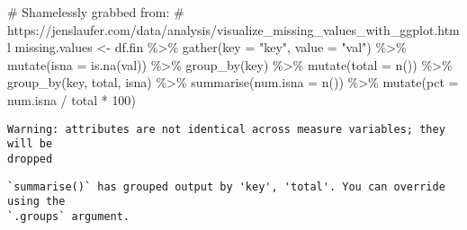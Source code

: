 \documentclass[
  letterpaper,
  DIV=11,
  numbers=noendperiod]{scrartcl}
\newenvironment{Shaded}{\begin{snugshade}}{\end{snugshade}}
\newcommand{\AttributeTok}[1]{\textcolor[rgb]{0.40,0.45,0.13}{#1}}
\newcommand{\CommentTok}[1]{\textcolor[rgb]{0.37,0.37,0.37}{#1}}
\newcommand{\DecValTok}[1]{\textcolor[rgb]{0.68,0.00,0.00}{#1}}
\newcommand{\FunctionTok}[1]{\textcolor[rgb]{0.28,0.35,0.67}{#1}}
\newcommand{\NormalTok}[1]{\textcolor[rgb]{0.00,0.23,0.31}{#1}}
\newcommand{\OtherTok}[1]{\textcolor[rgb]{0.00,0.23,0.31}{#1}}
\newcommand{\SpecialCharTok}[1]{\textcolor[rgb]{0.37,0.37,0.37}{#1}}
\newcommand{\StringTok}[1]{\textcolor[rgb]{0.13,0.47,0.30}{#1}}
\begin{document}
\begin{Shaded}
\begin{Highlighting}[]
\CommentTok{\# Shamelessly grabbed from: }
\CommentTok{\# https://jenslaufer.com/data/analysis/visualize\_missing\_values\_with\_ggplot.html}
\NormalTok{missing.values }\OtherTok{\textless{}{-}}\NormalTok{ df.fin }\SpecialCharTok{\%\textgreater{}\%}
  \FunctionTok{gather}\NormalTok{(}\AttributeTok{key =} \StringTok{"key"}\NormalTok{, }\AttributeTok{value =} \StringTok{"val"}\NormalTok{) }\SpecialCharTok{\%\textgreater{}\%}
  \FunctionTok{mutate}\NormalTok{(}\AttributeTok{isna =} \FunctionTok{is.na}\NormalTok{(val)) }\SpecialCharTok{\%\textgreater{}\%}
  \FunctionTok{group\_by}\NormalTok{(key) }\SpecialCharTok{\%\textgreater{}\%}
  \FunctionTok{mutate}\NormalTok{(}\AttributeTok{total =} \FunctionTok{n}\NormalTok{()) }\SpecialCharTok{\%\textgreater{}\%}
  \FunctionTok{group\_by}\NormalTok{(key, total, isna) }\SpecialCharTok{\%\textgreater{}\%}
  \FunctionTok{summarise}\NormalTok{(}\AttributeTok{num.isna =} \FunctionTok{n}\NormalTok{()) }\SpecialCharTok{\%\textgreater{}\%}
  \FunctionTok{mutate}\NormalTok{(}\AttributeTok{pct =}\NormalTok{ num.isna }\SpecialCharTok{/}\NormalTok{ total }\SpecialCharTok{*} \DecValTok{100}\NormalTok{)}
\end{Highlighting}
\end{Shaded}

\begin{verbatim}
Warning: attributes are not identical across measure variables; they will be
dropped
\end{verbatim}

\begin{verbatim}
`summarise()` has grouped output by 'key', 'total'. You can override using the
`.groups` argument.
\end{verbatim}
\end{document}
